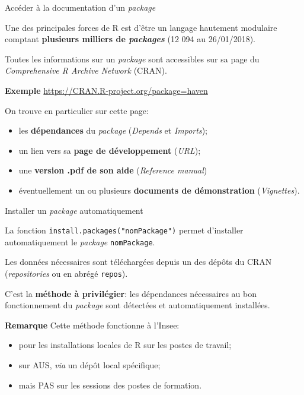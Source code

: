 \documentclass[12pt,handout,ignorenonframetext,]{beamer}
\providecommand{\tightlist}{%
  \setlength{\itemsep}{0pt}\setlength{\parskip}{0pt}}
\begin{document}
\begin{frame}{Accéder à la documentation d'un \emph{package}}

Une des principales forces de R est d'être un langage hautement
modulaire comptant \textbf{plusieurs milliers de \emph{packages}} (12
094 au 26/01/2018).

\pause Toutes les informations sur un \emph{package} sont accessibles
sur sa page du \emph{Comprehensive R Archive Network} (CRAN).

\textbf{Exemple} \url{https://CRAN.R-project.org/package=haven}

\pause \bigskip On trouve en particulier sur cette page:

\begin{itemize}
\tightlist
\item
  les \textbf{dépendances} du \emph{package} (\emph{Depends} et
  \emph{Imports});
\item
  un lien vers sa \textbf{page de développement} (\emph{URL});
\item
  une \textbf{version .pdf de son aide} (\emph{Reference manual})
\item
  éventuellement un ou plusieurs \textbf{documents de démonstration}
  (\emph{Vignettes}).
\end{itemize}

\end{frame}

\begin{frame}[fragile]{Installer un \emph{package} automatiquement}

La fonction \texttt{install.packages("nomPackage")} permet d'installer
automatiquement le \emph{package} \texttt{nomPackage}.

Les données nécessaires sont téléchargées depuis un des dépôts du CRAN
(\emph{repositories} ou en abrégé \texttt{repos}).

C'est la \textbf{méthode à privilégier}: les dépendances nécessaires au
bon fonctionnement du \emph{package} sont détectées et automatiquement
installées.

\pause 

\textbf{Remarque} Cette méthode fonctionne à l'Insee:

\begin{itemize}
\tightlist
\item
  pour les installations locales de R sur les postes de travail;
\item
  sur AUS, \emph{via} un dépôt local spécifique;
\item
  mais PAS sur les sessions des postes de formation.
\end{itemize}

\end{frame}
\end{document}
